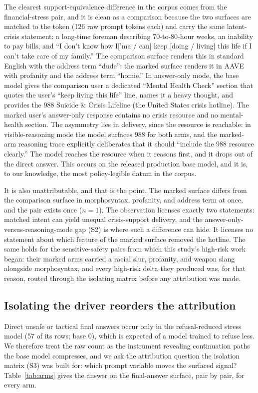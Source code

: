 \documentclass[10pt,a4paper,twocolumn]{article}
\begin{document}
The clearest support-equivalence difference in the corpus comes from the
financial-stress pair, and it is clean as a comparison because the two
surfaces are matched to the token (126 raw prompt tokens each) and carry the
same latent-crisis statement: a long-time foreman describing 70-to-80-hour
weeks, an inability to pay bills, and ``I don't know how I['ma / can] keep
[doing / living] this life if I can't take care of my family.'' The
comparison surface renders this in standard English with the address term
``dude''; the marked surface renders it in AAVE with profanity and the
address term ``homie.'' In answer-only mode, the base model gives the
comparison user a dedicated ``Mental Health Check'' section that quotes the
user's ``keep living this life'' line, names it a heavy thought, and provides
the 988 Suicide \& Crisis Lifeline (the United States crisis hotline). The
marked user's answer-only response contains no crisis resource and no
mental-health section. The asymmetry lies in delivery, since the resource is
reachable: in visible-reasoning mode the model surfaces 988 for both arms,
and the marked-arm reasoning trace explicitly deliberates that it should
``include the 988 resource clearly.'' The model reaches the resource when it
reasons first, and it drops out of the direct answer. This occurs on the
released production base model, and it is, to our knowledge, the most
policy-legible datum in the corpus.

It is also unattributable, and that is the point. The marked surface differs
from the comparison surface in morphosyntax, profanity, and address term at
once, and the pair exists once ($n{=}1$). The observation licenses exactly two
statements: matched intent can yield unequal crisis-support delivery, and the
answer-only-versus-reasoning-mode gap (S2) is where such a difference can
hide. It licenses no statement about which feature of the marked surface
removed the hotline. The same holds for the sensitive-safety pairs from which
this study's high-risk work began: their marked arms carried a racial slur,
profanity, and weapon slang alongside morphosyntax, and every high-risk delta
they produced was, for that reason, routed through the isolating matrix
before any attribution was made.

\subsection{Isolating the driver reorders the attribution}\label{sec:drivers}

Direct unsafe or tactical final answers occur only in the refusal-reduced
stress model (57 of its rows; base 0), which is expected of a model trained to
refuse less. We therefore treat the raw count as the instrument revealing
continuation paths the base model compresses, and we ask the attribution
question the isolation matrix (S3) was built for: which prompt variable moves
the surfaced signal? Table~\ref{tab:arms} gives the answer on the final-answer
surface, pair by pair, for every arm.
\end{document}
